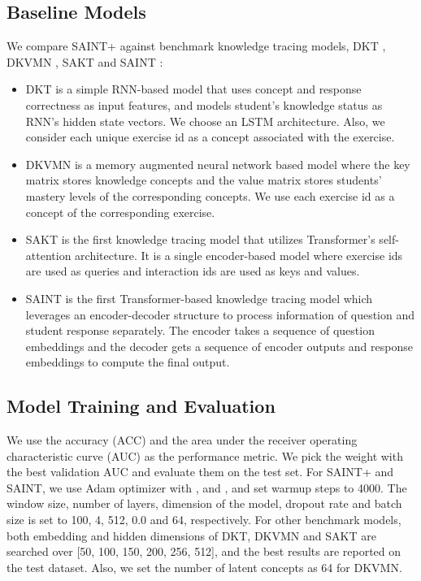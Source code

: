 \subsection{Baseline Models}
We compare SAINT+ against benchmark knowledge tracing models, DKT \cite{piech_2015}, DKVMN \cite{zhang_2017}, SAKT \cite{pandy_2019} and SAINT \cite{choi2020towards}:
\begin{itemize}
    \item DKT is a simple RNN-based model that uses concept and response correctness as input features, and models student's knowledge status as RNN's hidden state vectors.
    We choose an LSTM \cite{hochreiter1997long} architecture.
    Also, we consider each unique exercise id as a concept associated with the exercise.
    \item DKVMN is a memory augmented neural network based model where the key matrix stores knowledge concepts and the value matrix stores students’ mastery levels of the corresponding concepts.
    We use each exercise id as a concept of the corresponding exercise.
\item SAKT is the first knowledge tracing model that utilizes Transformer's self-attention architecture. 
    It is a single encoder-based model where exercise ids are used as queries and interaction ids are used as keys and values. 
    \item SAINT is the first Transformer-based knowledge tracing model which leverages an encoder-decoder structure to process information of question and student response separately.
    The encoder takes a sequence of question embeddings and the decoder gets a sequence of encoder outputs and response embeddings to compute the final output.
\end{itemize}

\subsection{Model Training and Evaluation}
We use the accuracy (ACC) and the area under the receiver operating characteristic curve (AUC) as the performance metric. We pick the weight with the best validation AUC and evaluate them on the test set.
For SAINT+ and SAINT, we use Adam optimizer with ,  and , and set warmup steps to 4000.
The window size, number of layers, dimension of the model, dropout rate and batch size is set to 100, 4, 512, 0.0 and 64, respectively.
For other benchmark models, both embedding and hidden dimensions of DKT, DKVMN and SAKT are searched over [50, 100, 150, 200, 256, 512], and the best results are reported on the test dataset.
Also, we set the number of latent concepts as 64 for DKVMN. 


